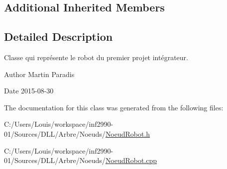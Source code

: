 \subsection*{Additional Inherited Members}


\subsection{Detailed Description}
Classe qui représente le robot du premier projet intégrateur. 

\begin{DoxyAuthor}{Author}
Martin Paradis 
\end{DoxyAuthor}
\begin{DoxyDate}{Date}
2015-\/08-\/30 
\end{DoxyDate}


The documentation for this class was generated from the following files\+:\begin{DoxyCompactItemize}
\item 
C\+:/\+Users/\+Louis/workspace/inf2990-\/01/\+Sources/\+D\+L\+L/\+Arbre/\+Noeuds/\hyperlink{_noeud_robot_8h}{Noeud\+Robot.\+h}\item 
C\+:/\+Users/\+Louis/workspace/inf2990-\/01/\+Sources/\+D\+L\+L/\+Arbre/\+Noeuds/\hyperlink{_noeud_robot_8cpp}{Noeud\+Robot.\+cpp}\end{DoxyCompactItemize}
